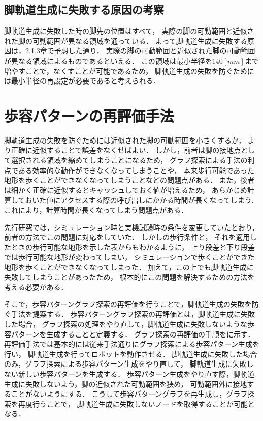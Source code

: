 \subsection{脚軌道生成に失敗する原因の考察}
脚軌道生成に失敗した時の脚先の位置はすべて，
実際の脚の可動範囲と近似された脚の可動範囲が異なる領域を通っている．
よって脚軌道生成に失敗する原因は，2.1.3章で予想した通り，
実際の脚の可動範囲と近似された脚の可動範囲が異なる領域によるものであるといえる．
この領域は最小半径を$140 [mm]$まで増やすことで，なくすことが可能であるため，
脚軌道生成の失敗を防ぐためには最小半径の再設定が必要であると考えられる．

\section{歩容パターンの再評価手法}
脚軌道生成の失敗を防ぐためには近似された脚の可動範囲を小さくするか，
より正確に近似することで誤差をなくせばよい．
しかし，前者は脚の接地点として選択される領域を縮めてしまうことになるため，
グラフ探索による手法の利点である効率的な動作ができなくなってしまうことや，
本来歩行可能であった地形を歩くことができなくなってしまうことなどの問題点がある．
また，後者は細かく正確に近似するとキャッシュしておく値が増えるため，
あらかじめ計算しておいた値にアクセスする際の呼び出しにかかる時間が長くなってしまう．
これにより，計算時間が長くなってしまう問題点がある．

先行研究では，シミュレーション時と実機試験時の条件を変更していたとおり，
前者の方法でこの問題に対応をしていた．
しかしの歩行条件と，
それを適用したときの歩行可能な地形を示した表からもわかるように，
上り段差と下り段差では歩行可能な地形が変わってしまい，
シミュレーションで歩くことができた地形を歩くことができなくなってしまった．
加えて，この上でも脚軌道生成に失敗してしまうことがあったため，
根本的にこの問題を解決するための方法を考える必要がある．

そこで，歩容パターングラフ探索の再評価を行うことで，脚軌道生成の失敗を防ぐ手法を提案する．
歩容パターングラフ探索の再評価とは，脚軌道生成に失敗した場合，
グラフ探索の処理をやり直して，脚軌道生成に失敗しないような歩容パターンを生成することと定義する．
グラフ探索の再評価の手順をに示す．
再評価手法では基本的には従来手法通りにグラフ探索による歩容パターン生成を行い，
脚軌道生成を行ってロボットを動作させる．
脚軌道生成に失敗した場合のみ，グラフ探索による歩容パターン生成をやり直して，
脚軌道生成に失敗しない新しい歩容パターンを生成する．
歩容パターン生成をやり直す際，脚軌道生成に失敗しないよう，脚の近似された可動範囲を狭め，
可動範囲外に接地することがないようにする．
こうして歩容パターングラフを再生成し，グラフ探索を再度行うことで，
脚軌道生成に失敗しないノードを取得することが可能となる．

